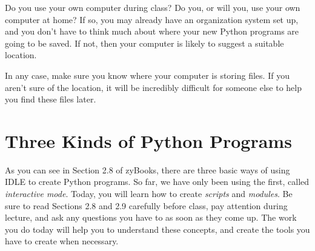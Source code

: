 Do you use your own computer during class?  Do you, or will you, use your own computer at home?  If so, you may already have an organization system set up, and you don't have to think much about where your new Python programs are going to be saved.  If not, then your computer is likely to suggest a suitable location.

In any case, make sure you know where your computer is storing files.  If you aren't sure of the location, it will be incredibly difficult for someone else to help you find these files later.

\section{Three Kinds of Python Programs}

As you can see in Section 2.8 of zyBooks, there are three basic ways of using IDLE to create Python programs.  So far, we have only been using the first, called \textit{interactive mode}.  Today, you will learn how to create \textit{scripts} and \textit{modules}.  Be sure to read Sections 2.8 and 2.9 carefully before class, pay attention during lecture, and ask any questions you have to as soon as they come up.  The work you do today will help you to understand these concepts, and create the tools you have to create when necessary.